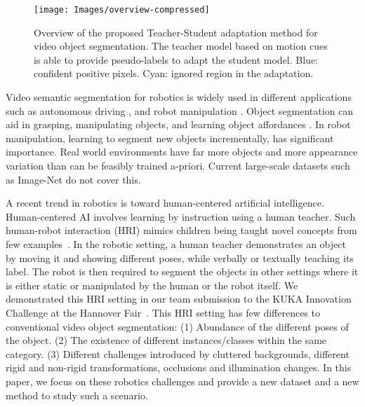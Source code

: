 \documentclass[letterpaper, 10 pt, conference]{ieeeconf}
\begin{document}
\begin{figure}[]
\centering
    \texttt{[image: Images/overview-compressed]}
    \caption{Overview of the proposed Teacher-Student adaptation method for video object segmentation. The teacher model based on motion cues is able to provide pseudo-labels to adapt the student model. Blue: confident positive pixels. Cyan: ignored region in the adaptation.}
     \label{fig:overview}
\end{figure}

Video semantic segmentation for robotics is widely used in different applications such as autonomous driving \cite{cordts2016cityscapes}\cite{ros2016synthia}, and robot manipulation \cite{do2017affordancenet}\cite{kenney2009interactive}. Object segmentation can aid in grasping, manipulating objects, and learning object affordances \cite{do2017affordancenet}. In robot manipulation, learning to segment new objects incrementally, has significant importance. Real world environments have far more objects and more appearance variation than can be feasibly trained a-priori. Current large-scale datasets such as Image-Net \cite{krizhevsky2012imagenet} do not cover this. 

A recent trend in robotics is toward human-centered artificial intelligence. Human-centered AI involves learning by instruction using a human teacher. Such human-robot interaction (HRI) mimics children being taught novel concepts from few examples~\cite{markman1989categorization}. In the robotic setting, a human teacher demonstrates an object by moving it and showing different poses, while verbally or textually teaching its label. The robot is then required to segment the objects in other settings where it is either static or manipulated by the human or the robot itself. We demonstrated this HRI setting in our team submission to the KUKA Innovation Challenge at the Hannover Fair~\cite{KUKAIA}. This HRI setting has few differences to conventional video object segmentation: (1) Abundance of the different poses of the object. (2) The existence of different instances/classes within the same category. (3) Different challenges introduced by cluttered backgrounds, different rigid and non-rigid transformations, occlusions and illumination changes. In this paper, we focus on these robotics challenges and provide a new dataset and a new method to study such a scenario.
\end{document}

